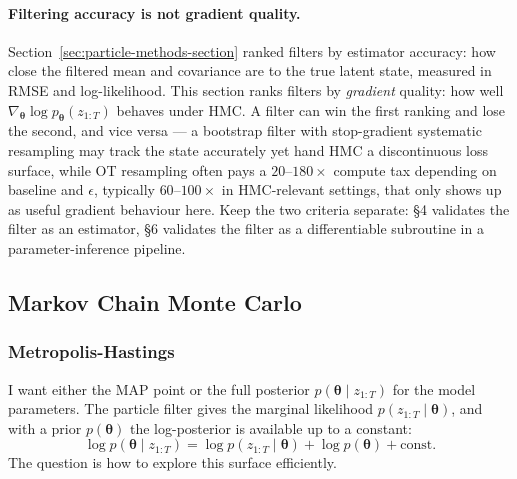 \documentclass{article}
\renewcommand{\v}[1]{ \ensuremath{ {\mathbf{#1}} }}
\begin{document}
\paragraph{Filtering accuracy is not gradient quality.} Section~\ref{sec:particle-methods-section} ranked filters by estimator accuracy: how close the filtered mean and covariance are to the true latent state, measured in RMSE and log-likelihood. This section ranks filters by \emph{gradient} quality: how well $\nabla_{\boldsymbol{\theta}} \log p_{\boldsymbol{\theta}}(z_{1:T})$ behaves under HMC. A filter can win the first ranking and lose the second, and vice versa --- a bootstrap filter with stop-gradient systematic resampling may track the state accurately yet hand HMC a discontinuous loss surface, while OT resampling often pays a $20$--$180\times$ compute tax depending on baseline and $\epsilon$, typically $60$--$100\times$ in HMC-relevant settings, that only shows up as useful gradient behaviour here. Keep the two criteria separate: §4 validates the filter as an estimator, §6 validates the filter as a differentiable subroutine in a parameter-inference pipeline.

\subsection{Markov Chain Monte Carlo}

\subsubsection{Metropolis-Hastings}
\label{sec:metropolis-hastings}

I want either the MAP point or the full posterior $p(\v \theta \mid z_{1:T})$ for the model parameters. The particle filter gives the marginal likelihood $p(z_{1:T} \mid \v \theta)$, and with a prior $p(\v \theta)$ the log-posterior is available up to a constant:
\begin{equation}
    \log p(\v \theta \mid z_{1:T}) = \log p(z_{1:T} \mid \v \theta) + \log p(\v \theta) + \text{const}.
    \label{eq:hmc-log-posterior}
\end{equation}
The question is how to explore this surface efficiently.
\end{document}
